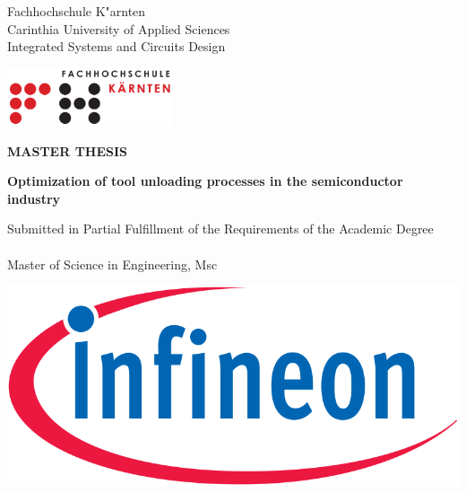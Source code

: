 %
%
%
%

\thispagestyle{empty}

\begin{minipage}[b]{10cm}
Fachhochschule K"arnten \\
Carinthia University of Applied Sciences\\
Integrated Systems and Circuits Design 
\end{minipage}\hfill
\begin{minipage}[b]{5cm}
\includegraphics[height=1.7cm]{./pictures/FH_KAERNTEN_logo_rgb_20cm.jpg}
\end{minipage}
\vspace{1.5cm}

\begin{center}
{\huge {\textbf{MASTER THESIS}}}

\vspace{1.5cm}
{\Large {\textbf{ 
\baselineskip25pt
Optimization of tool unloading processes in the semiconductor industry  \\}}}

\vspace{1.5cm}
Submitted in Partial Fulfillment of the Requirements of the Academic Degree\\~\\

Master of Science in Engineering, Msc
\end{center}
\vspace{0.5cm}
\begin{center}
    \includegraphics[scale=0.25]{pictures/Infineon-Logo.svg.png}
\end{center}

